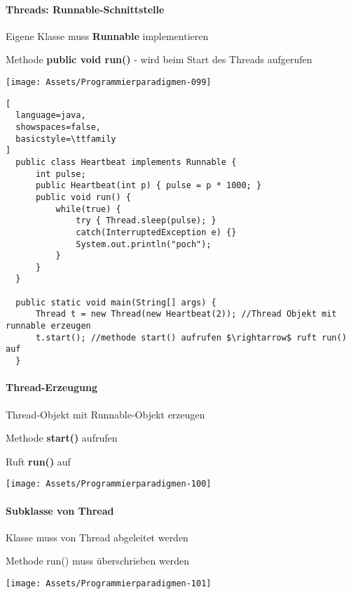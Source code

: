 \documentclass[10pt]{article}
\begin{document}
\paragraph{Threads: Runnable-Schnittstelle}
Eigene Klasse muss \textbf{Runnable} implementieren
\begin{itemize*}
  \item Methode \textbf{public void run()} - wird beim Start des Threads aufgerufen
\end{itemize*}
\begin{center}
  \texttt{[image: Assets/Programmierparadigmen-099]}
\end{center}
\begin{lstlisting}[
  language=java,
  showspaces=false,
  basicstyle=\ttfamily
]
  public class Heartbeat implements Runnable {
      int pulse;
      public Heartbeat(int p) { pulse = p * 1000; }
      public void run() {
          while(true) {
              try { Thread.sleep(pulse); }
              catch(InterruptedException e) {}
              System.out.println("poch");
          }
      }
  }

  public static void main(String[] args) {
      Thread t = new Thread(new Heartbeat(2)); //Thread Objekt mit runnable erzeugen
      t.start(); //methode start() aufrufen $\rightarrow$ ruft run() auf
  }
\end{lstlisting}

\paragraph{Thread-Erzeugung}
\begin{itemize*}
  \item Thread-Objekt mit Runnable-Objekt erzeugen
  \item Methode \textbf{start()} aufrufen
  \begin{itemize*}
    \item Ruft \textbf{run()} auf
  \end{itemize*}
\end{itemize*}
\begin{center}
  \texttt{[image: Assets/Programmierparadigmen-100]}
\end{center}

\paragraph{Subklasse von Thread}
\begin{itemize*}
  \item Klasse muss von Thread abgeleitet werden
  \item Methode run() muss überschrieben werden
\end{itemize*}
\begin{center}
  \texttt{[image: Assets/Programmierparadigmen-101]}
\end{center}
\end{document}
